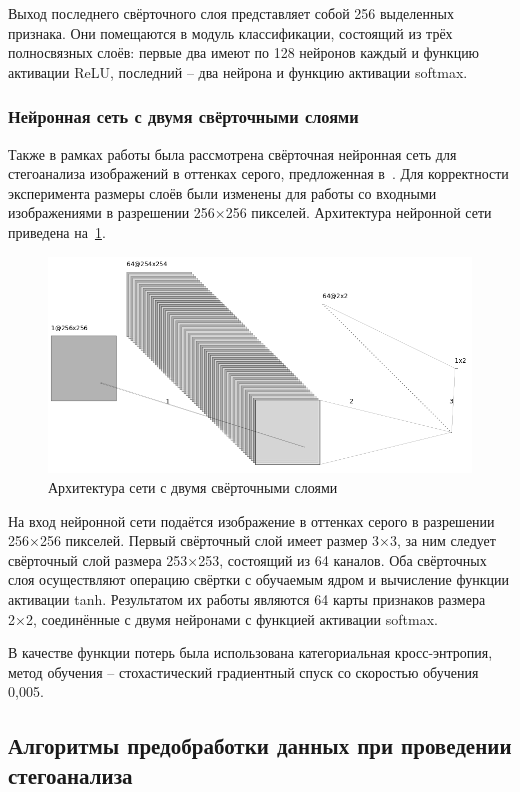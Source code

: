 Выход последнего свёрточного слоя представляет собой 256 выделенных признака. Они помещаются в модуль классификации, состоящий из трёх полносвязных слоёв: первые два имеют по 128 нейронов каждый и функцию активации ReLU, последний – два нейрона и функцию активации softmax.

\subsubsection{Нейронная сеть с двумя свёрточными слоями}
Также в рамках работы была рассмотрена свёрточная нейронная сеть для стегоанализа изображений в оттенках серого, предложенная в~\cite{FrenchCNN}. Для корректности эксперимента размеры слоёв были изменены для работы со входными изображениями в разрешении 256×256 пикселей. Архитектура нейронной сети приведена на~\ref{fig:FrenchCNNArchitecture}.

\begin{figure}[!htb]
\centering
\includegraphics[width=1\textwidth]{include/graphics/french_gray_architecture}
\caption{Архитектура сети с двумя свёрточными слоями}
\label{fig:FrenchCNNArchitecture}
\end{figure}

На вход нейронной сети подаётся изображение в оттенках серого в разрешении 256×256 пикселей. Первый свёрточный слой имеет размер 3×3, за ним следует свёрточный слой размера 253×253, состоящий из 64 каналов. Оба свёрточных слоя осуществляют операцию свёртки с обучаемым ядром и вычисление функции активации tanh. Результатом их работы являются 64 карты признаков размера 2×2, соединённые с двумя нейронами с функцией активации softmax.

В качестве функции потерь была использована категориальная кросс-энтропия, метод обучения – стохастический градиентный спуск со скоростью обучения 0,005.
\subsection{Алгоритмы предобработки данных при проведении стегоанализа}

\clearpage
